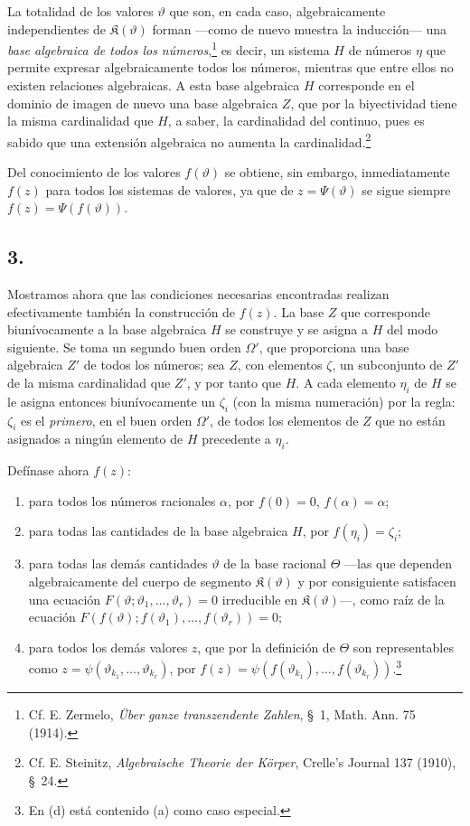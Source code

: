 La totalidad de los valores $\vartheta$ que son, en cada caso, algebraicamente independientes de $\mathfrak K(\vartheta)$ forman ---como de nuevo muestra la inducción--- una \emph{base algebraica de todos los números},\footnote{Cf. E. Zermelo, \emph{Über ganze transzendente Zahlen}, \S\ 1, Math. Ann. 75 (1914).} es decir, un sistema $H$ de números $\eta$ que permite expresar algebraicamente todos los números, mientras que entre ellos no existen relaciones algebraicas. A esta base algebraica $H$ corresponde en el dominio de imagen de nuevo una base algebraica $Z$, que por la biyectividad tiene la misma cardinalidad que $H$, a saber, la cardinalidad del continuo, pues es sabido que una extensión algebraica no aumenta la cardinalidad.\footnote{Cf. E. Steinitz, \emph{Algebraische Theorie der Körper}, Crelle's Journal 137 (1910), \S\ 24.}

Del conocimiento de los valores $f(\vartheta)$ se obtiene, sin embargo, inmediatamente $f(z)$ para todos los sistemas de valores, ya que de $z=\Psi(\vartheta)$ se sigue siempre $f(z)=\Psi(f(\vartheta))$.

\subsection*{3.}

Mostramos ahora que las condiciones necesarias encontradas realizan efectivamente también la construcción de $f(z)$. La base $Z$ que corresponde biunívocamente a la base algebraica $H$ se construye y se asigna a $H$ del modo siguiente. Se toma un segundo buen orden $\Omega'$, que proporciona una base algebraica $Z'$ de todos los números; sea $Z$, con elementos $\zeta$, un subconjunto de $Z'$ de la misma cardinalidad que $Z'$, y por tanto que $H$. A cada elemento $\eta_i$ de $H$ se le asigna entonces biunívocamente un $\zeta_i$ (con la misma numeración) por la regla: $\zeta_i$ es el \emph{primero}, en el buen orden $\Omega'$, de todos los elementos de $Z$ que no están asignados a ningún elemento de $H$ precedente a $\eta_i$.

Defínase ahora $f(z)$:
\begin{enumerate}
\item[a)] para todos los números racionales $\alpha$, por $f(0)=0$, $f(\alpha)=\alpha$;
\item[b)] para todas las cantidades de la base algebraica $H$, por $f(\eta_i)=\zeta_i$;
\item[c)] para todas las demás cantidades $\vartheta$ de la base racional $\Theta$ ---las que dependen algebraicamente del cuerpo de segmento $\mathfrak K(\vartheta)$ y por consiguiente satisfacen una ecuación $F(\vartheta;\vartheta_1,\ldots,\vartheta_r)=0$ irreducible en $\mathfrak K(\vartheta)$---, como raíz de la ecuación $F(f(\vartheta);f(\vartheta_1),\ldots,f(\vartheta_r))=0$;
\item[d)] para todos los demás valores $z$, que por la definición de $\Theta$ son representables como $z=\psi(\vartheta_{k_1},\ldots,\vartheta_{k_r})$, por $f(z)=\psi(f(\vartheta_{k_1}),\ldots,f(\vartheta_{k_r}))$.\footnote{En (d) está contenido (a) como caso especial.}
\end{enumerate}

